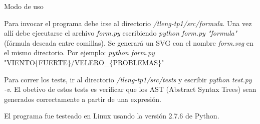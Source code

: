
\begin{section}{Modo de uso}

Para invocar el programa debe irse al directorio \textit{/tleng-tp1/src/formula}. Una vez allí debe ejecutarse el archivo \textit{form.py} escribiendo
\textit{python form.py "formula"} (fórmula deseada entre comillas). Se generará un SVG con el nombre \textit{form.svg} en el mismo directorio.
Por ejemplo: \textit{python form.py} "VIENTO\{FUERTE\}/VELERO\_\{PROBLEMAS\}"

Para correr los tests, ir al directorio \textit{/tleng-tp1/src/tests} y escribir \textit{python test.py -v}. El obetivo de estos tests es verificar
que los AST (Abstract Syntax Trees) sean generados correctamente a partir de una expresión.

El programa fue testeado en Linux usando la versión 2.7.6 de Python.

\end{section}